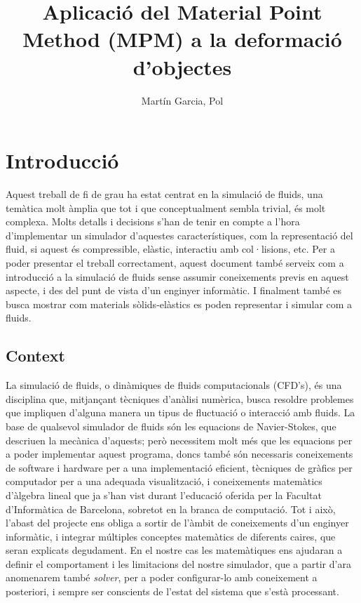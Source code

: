 \documentclass[a4paper]{report}
\title{Aplicació del Material Point Method (MPM) a la deformació d'objectes}
\author{Martín Garcia, Pol}
\date{\parbox{\linewidth}{\centering%
		2019, Quadrimestre de tardor\endgraf\bigskip
		Director: Susín Sánchez, Toni\endgraf \medskip
		Especialitat Computació \endgraf
		Facultat d'Informàtica de Barcelona \endgraf UPC}}
\begin{document}
	\maketitle
	\newpage
	

	\renewcommand{\contentsname}{Índex}
	
	\tableofcontents
	\newpage
	
	
	\chapter{Introducció}
	Aquest treball de fi de grau ha estat centrat en la simulació de fluids, una temàtica molt àmplia que tot i que conceptualment sembla trivial, és molt complexa. Molts detalls i decisions s'han de tenir en compte a l'hora d'implementar un simulador d'aquestes característiques, com la representació del fluid, si aquest és compressible, elàstic, interactiu amb col·lisions, etc. \newline
	Per a poder presentar el treball correctament, aquest document també serveix com a introducció a la simulació de fluids sense assumir coneixements previs en aquest aspecte, i des del punt de vista d'un enginyer informàtic.\newline
	I finalment també es busca mostrar com materials sòlids-elàstics es poden representar i simular com a fluids.\newline

	\section{Context}
	La simulació de fluids, o dinàmiques de fluids computacionals (CFD's), és una disciplina que, mitjançant tècniques d'anàlisi numèrica, busca resoldre problemes que impliquen d'alguna manera un tipus de fluctuació o interacció amb fluids. \newline
	La base de qualsevol simulador de fluids són les equacions de Navier-Stokes, que descriuen la mecànica d'aquests; però necessitem molt més que les equacions per a poder implementar aquest programa, doncs també són necessaris coneixements de software i hardware per a una implementació eficient, tècniques de gràfics per computador per a una adequada visualització, i coneixements matemàtics d'àlgebra lineal que ja s'han vist durant l'educació oferida per la Facultat d'Informàtica de Barcelona, sobretot en la branca de computació. Tot i això, l'abast del projecte ens obliga a sortir de l'àmbit de coneixements d'un enginyer informàtic, i integrar múltiples conceptes matemàtics de diferents caires, que seran explicats degudament. \newline
	En el nostre cas les matemàtiques ens ajudaran a definir el comportament i les limitacions del nostre simulador, que a partir d'ara anomenarem també \textit{solver}, per a poder configurar-lo amb coneixement a posteriori, i sempre ser conscients de l'estat del sistema que s'està processant. \newline
	
\end{document}
